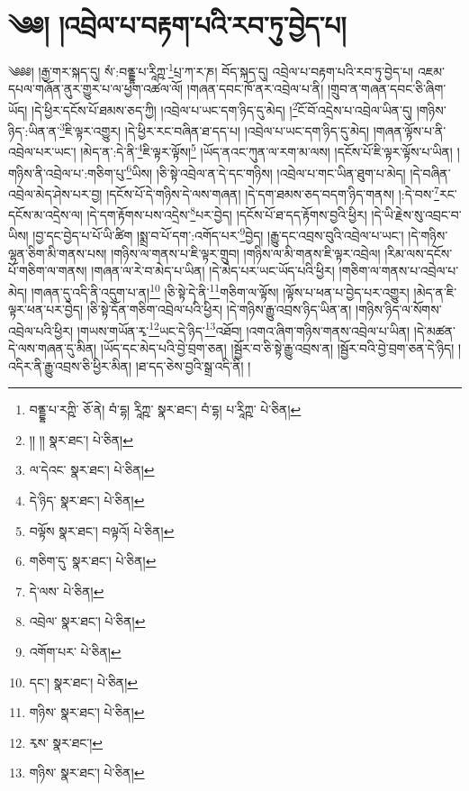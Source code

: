 \setcounter{footnote}{0} 
\chapter{༄༅། །འབྲེལ་པ་བརྟག་པའི་རབ་ཏུ་བྱེད་པ།}༄༅༅། །རྒྱ་གར་སྐད་དུ། སཾ་:བནྡྷ་པ་རཱིཀྵ་\footnote{བནྡྷ་པ་རཀྵི་  ཅོ་ནེ། བཾ་དྷ། རཱིཀྵ་  སྣར་ཐང་། བཾ་དྷ། པ་རཱིཀྵ་  པེ་ཅིན། }པྲ་ཀ་ར་ཎ། བོད་སྐད་དུ། འབྲེལ་པ་བརྟག་པའི་རབ་ཏུ་བྱེད་པ། འཇམ་དཔལ་གཞོན་ནུར་གྱུར་པ་ལ་ཕྱག་འཚལ་ལོ། །གཞན་དབང་ཁོ་ནར་འབྲེལ་པ་ནི། །གྲུབ་ན་གཞན་དབང་ཅི་ཞིག་ཡོད། །དེ་ཕྱིར་དངོས་པོ་ཐམས་ཅད་ཀྱི། །འབྲེལ་པ་ཡང་དག་ཉིད་དུ་མེད། །\footnote{།། །།  སྣར་ཐང་།  པེ་ཅིན། }ངོ་བོ་འདྲེས་པ་འབྲེལ་ཡིན་དུ། །གཉིས་ཉིད་:ཡིན་ན་\footnote{ལ་དེའང་  སྣར་ཐང་།  པེ་ཅིན། }ཇི་ལྟར་འགྱུར། །དེ་ཕྱིར་རང་བཞིན་ཐ་དད་པ། །འབྲེལ་པ་ཡང་དག་ཉིད་དུ་མེད། །གཞན་ལྟོས་པ་ནི་འབྲེལ་པར་ཡང་། །མེད་ན་:དེ་ནི་\footnote{དེ་ཉིད་  སྣར་ཐང་།  པེ་ཅིན། }ཇི་ལྟར་ལྟོས།\footnote{བལྟོས  སྣར་ཐང་། བལྟའོ།  པེ་ཅིན། } །ཡོད་ནའང་ཀུན་ལ་རག་མ་ལས། །དངོས་པོ་ཇི་ལྟར་ལྟོས་པ་ཡིན། །གཉིས་ནི་འབྲེལ་པ་:གཅིག་པུ་\footnote{གཅིག་དུ་  སྣར་ཐང་།  པེ་ཅིན། }ཡིས། །ཅི་སྟེ་འབྲེལ་ན་དེ་དང་གཉིས། །འབྲེལ་པ་གང་ཡིན་ཐུག་པ་མེད། །དེ་བཞིན་འབྲེལ་མེད་ཤེས་པར་བྱ། །དངོས་པོ་དེ་གཉིས་དེ་ལས་གཞན། །དེ་དག་ཐམས་ཅད་བདག་ཉིད་གནས། །:དེ་བས་\footnote{དེ་ལས་  པེ་ཅིན། }རང་དངོས་མ་འདྲེས་ལ། །དེ་དག་རྟོགས་པས་འདྲེས་\footnote{འབྲེལ་  སྣར་ཐང་།  པེ་ཅིན། }པར་བྱེད། །དངོས་པོ་ཐ་དད་རྟོགས་བྱའི་ཕྱིར། །དེ་ཡི་རྗེས་སུ་འབྲང་བ་ཡིས། །བྱ་དང་བྱེད་པ་པོ་ཡི་ཚིག །སྨྲ་བ་པོ་དག་:འགོད་པར་\footnote{འགོག་པར་  པེ་ཅིན། }བྱེད། །རྒྱུ་དང་འབྲས་བུའི་འབྲེལ་པ་ཡང་། །དེ་གཉིས་ལྷན་ཅིག་མི་གནས་པས། །གཉིས་ལ་གནས་པ་ཇི་ལྟར་གྲུབ། །གཉིས་ལ་མི་གནས་ཇི་ལྟར་འབྲེལ། །རིམ་ལས་དངོས་པོ་གཅིག་ལ་གནས། །གཞན་ལ་རེ་བ་མེད་པ་ཡིན། །དེ་མེད་པར་ཡང་ཡོད་པའི་ཕྱིར། །གཅིག་ལ་གནས་པ་འབྲེལ་པ་མེད། །གཞན་དུ་འདི་ནི་འདུག་པ་ན།\footnote{དང་།  སྣར་ཐང་།  པེ་ཅིན། } །ཅི་སྟེ་དེ་ནི་\footnote{གཉིས་  སྣར་ཐང་།  པེ་ཅིན། }གཅིག་ལ་ལྟོས། །ལྟོས་པ་ཕན་པ་བྱེད་པར་འགྱུར། །མེད་ན་ཇི་ལྟར་ཕན་པར་བྱེད། །ཅི་སྟེ་དོན་གཅིག་འབྲེལ་པའི་ཕྱིར། །དེ་གཉིས་རྒྱུ་འབྲས་ཉིད་ཡིན་ན། །གཉིས་ཉིད་ལ་སོགས་འབྲེལ་པའི་ཕྱིར། །གཡས་གཡོན་རྭ་\footnote{རྭས་  སྣར་ཐང་། }ཡང་དེ་ཉིད་\footnote{གཉིས་  སྣར་ཐང་།  པེ་ཅིན། }འཐོབ། །འགའ་ཞིག་གཉིས་གནས་འབྲེལ་པ་ཡིན། །དེ་མཚན་དེ་ལས་གཞན་དུ་མིན། །ཡོད་དང་མེད་པའི་བྱེ་བྲག་ཅན། །སྦྱོར་བ་ཅི་སྟེ་རྒྱུ་འབྲས་ན། །སྦྱོར་བའི་བྱེ་བྲག་ཅན་དེ་ཉིད། །འདིར་ནི་རྒྱུ་འབྲས་ཅི་ཕྱིར་མིན། །ཐ་དད་ཅེས་བྱའི་སྒྲ་འདི་ནི། །
